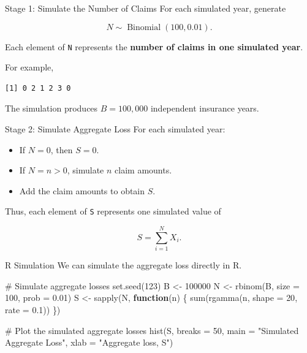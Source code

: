 \documentclass[
  ignorenonframetext,
  aspectratio=169,
]{beamer}
\newenvironment{Shaded}{\begin{snugshade}}{\end{snugshade}}
\newcommand{\AttributeTok}[1]{\textcolor[rgb]{0.40,0.45,0.13}{#1}}
\newcommand{\CommentTok}[1]{\textcolor[rgb]{0.37,0.37,0.37}{#1}}
\newcommand{\ControlFlowTok}[1]{\textcolor[rgb]{0.00,0.23,0.31}{\textbf{#1}}}
\newcommand{\DecValTok}[1]{\textcolor[rgb]{0.68,0.00,0.00}{#1}}
\newcommand{\FloatTok}[1]{\textcolor[rgb]{0.68,0.00,0.00}{#1}}
\newcommand{\FunctionTok}[1]{\textcolor[rgb]{0.28,0.35,0.67}{#1}}
\newcommand{\NormalTok}[1]{\textcolor[rgb]{0.00,0.23,0.31}{#1}}
\newcommand{\OtherTok}[1]{\textcolor[rgb]{0.00,0.23,0.31}{#1}}
\newcommand{\StringTok}[1]{\textcolor[rgb]{0.13,0.47,0.30}{#1}}
\providecommand{\tightlist}{%
  \setlength{\itemsep}{0pt}\setlength{\parskip}{0pt}}
\begin{document}
\begin{frame}[fragile]{Stage 1: Simulate the Number of Claims}
\protect{}\label{stage-1-simulate-the-number-of-claims}
For each simulated year, generate

\[
N\sim\operatorname{Binomial}(100,0.01).
\]

Each element of \texttt{N} represents the \textbf{number of claims in
one simulated year}.

For example,

\begin{verbatim}
[1] 0 2 1 2 3 0
\end{verbatim}

The simulation produces \(B=100{,}000\) independent insurance years.
\end{frame}

\begin{frame}[fragile]{Stage 2: Simulate Aggregate Loss}
\protect{}\label{stage-2-simulate-aggregate-loss}
For each simulated year:

\begin{itemize}
\tightlist
\item
  If \(N=0\), then \(S=0\).
\item
  If \(N=n>0\), simulate \(n\) claim amounts.
\item
  Add the claim amounts to obtain \(S\).
\end{itemize}

Thus, each element of \texttt{S} represents one simulated value of

\[
S=\sum_{i=1}^{N}X_i.
\]
\end{frame}

\begin{frame}[fragile]{R Simulation}
\protect{}\label{r-simulation-1}
We can simulate the aggregate loss directly in R.

\begin{Shaded}
\begin{Highlighting}[]
\CommentTok{\# Simulate aggregate losses}
\FunctionTok{set.seed}\NormalTok{(}\DecValTok{123}\NormalTok{)}
\NormalTok{B }\OtherTok{\textless{}{-}} \DecValTok{100000}
\NormalTok{N }\OtherTok{\textless{}{-}} \FunctionTok{rbinom}\NormalTok{(B, }\AttributeTok{size =} \DecValTok{100}\NormalTok{, }\AttributeTok{prob =} \FloatTok{0.01}\NormalTok{)}
\NormalTok{S }\OtherTok{\textless{}{-}} \FunctionTok{sapply}\NormalTok{(N, }\ControlFlowTok{function}\NormalTok{(n) \{}
  \FunctionTok{sum}\NormalTok{(}\FunctionTok{rgamma}\NormalTok{(n, }\AttributeTok{shape =} \DecValTok{20}\NormalTok{, }\AttributeTok{rate =} \FloatTok{0.1}\NormalTok{))}
\NormalTok{\})}

\CommentTok{\# Plot the simulated aggregate losses}
\FunctionTok{hist}\NormalTok{(S, }\AttributeTok{breaks =} \DecValTok{50}\NormalTok{,}
     \AttributeTok{main =} \StringTok{"Simulated Aggregate Loss"}\NormalTok{,}
     \AttributeTok{xlab =} \StringTok{"Aggregate loss, S"}\NormalTok{)}
\end{Highlighting}
\end{Shaded}
\end{frame}
\end{document}
